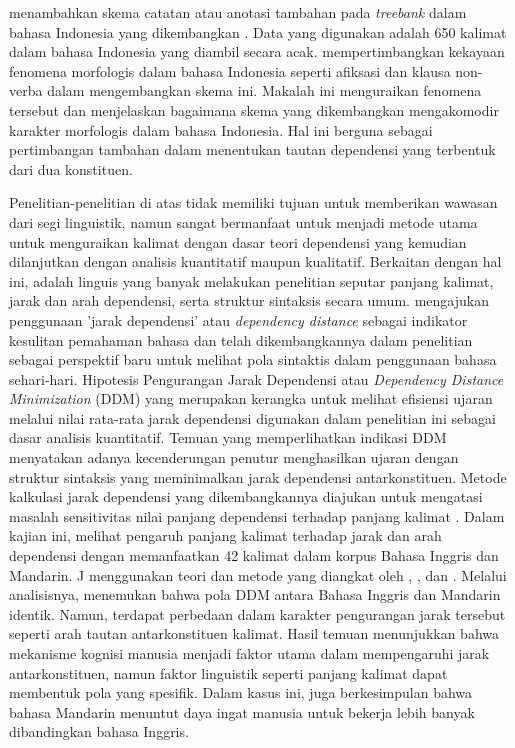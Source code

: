 \cite{irmawati2015dependency} menambahkan skema catatan atau anotasi tambahan pada \textit{treebank} dalam bahasa Indonesia yang dikembangkan \cite{green2012indonesian}. Data yang digunakan adalah 650 kalimat dalam bahasa Indonesia yang diambil secara acak. \cite{irmawati2015dependency} mempertimbangkan kekayaan fenomena morfologis dalam bahasa Indonesia seperti afiksasi dan klausa non-verba dalam mengembangkan skema ini. Makalah ini menguraikan fenomena tersebut dan menjelaskan bagaimana skema yang dikembangkan mengakomodir karakter morfologis dalam bahasa Indonesia. Hal ini berguna sebagai pertimbangan tambahan dalam menentukan tautan dependensi yang terbentuk dari dua konstituen. 

Penelitian-penelitian di atas tidak memiliki tujuan untuk memberikan wawasan dari segi linguistik, namun sangat bermanfaat untuk menjadi metode utama untuk menguraikan kalimat dengan dasar teori dependensi yang kemudian dilanjutkan dengan analisis kuantitatif maupun kualitatif. Berkaitan dengan hal ini, \cite{liu2008dependency} adalah linguis yang banyak melakukan penelitian seputar panjang kalimat, jarak dan arah dependensi, serta struktur sintaksis secara umum. \cite{liu2008dependency} mengajukan penggunaan 'jarak dependensi' atau \textit{dependency distance} sebagai indikator kesulitan pemahaman bahasa dan telah dikembangkannya dalam penelitian \cite{liu2017dependency} sebagai perspektif baru untuk melihat pola sintaktis dalam penggunaan bahasa sehari-hari. Hipotesis Pengurangan Jarak Dependensi atau \textit{Dependency Distance Minimization} (DDM) yang merupakan kerangka untuk melihat efisiensi ujaran melalui nilai rata-rata jarak dependensi digunakan dalam penelitian ini sebagai dasar analisis kuantitatif. Temuan yang memperlihatkan indikasi DDM menyatakan adanya kecenderungan penutur menghasilkan ujaran dengan struktur sintaksis yang meminimalkan jarak dependensi antarkonstituen. Metode kalkulasi jarak dependensi yang dikembangkannya diajukan untuk mengatasi masalah sensitivitas nilai panjang dependensi terhadap panjang kalimat \citep{jiang2015effects}. Dalam kajian ini, \cite{jiang2015effects} melihat pengaruh panjang kalimat terhadap jarak dan arah dependensi dengan memanfaatkan 42 kalimat dalam korpus Bahasa Inggris dan Mandarin. J \cite{jiang2015effects} menggunakan teori dan metode yang diangkat oleh \cite{tesniere1959elements}, \cite{hudson2007language}, dan \cite{nivre2006maltparser}. Melalui analisisnya,  \cite{jiang2015effects} menemukan bahwa pola DDM antara Bahasa Inggris dan Mandarin identik. Namun, terdapat perbedaan dalam karakter pengurangan jarak tersebut seperti arah tautan antarkonstituen kalimat. Hasil temuan menunjukkan bahwa mekanisme kognisi manusia menjadi faktor utama dalam mempengaruhi jarak antarkonstituen, namun faktor linguistik seperti panjang kalimat dapat membentuk pola yang spesifik. Dalam kasus ini, \cite{jiang2015effects} juga berkesimpulan bahwa bahasa Mandarin menuntut daya ingat manusia untuk bekerja lebih banyak dibandingkan bahasa Inggris. 


